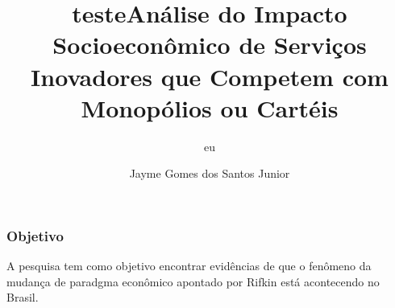 \documentclass[11pt]{beamer}
\author{eu}
\title{teste}
\title[Estatística Aplicada a Geopolítica]{Análise do Impacto Socioeconômico de Serviços Inovadores que Competem com Monopólios ou Cartéis} %
\author{Jayme Gomes dos Santos Junior}
\institute[Universidade Federal do Paraná] 
{
  \inst{}%
  Paulo Afonso Bracarense Costa\\
  Orientador
  }
\date{}
\begin{document}


\begin{frame}
\titlepage %
\end{frame}








\begin{frame}
\frametitle{Objetivo}
\begin{block}

A pesquisa tem como objetivo encontrar evidências
de que o fenômeno da mudança de paradgma econômico
apontado por Rifkin está acontecendo no Brasil.
\end{block}
\end{frame}
\end{document}
